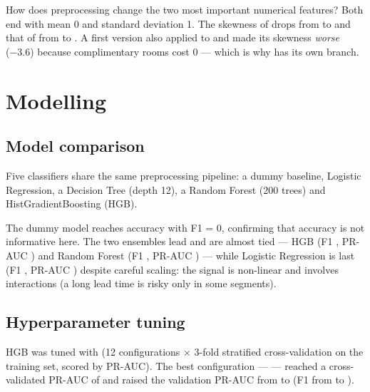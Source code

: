 \begin{finding}
\Q How does preprocessing change the two most important numerical features?
\F Both end with mean 0 and standard deviation 1. The skewness of  drops from \TBSkewLeadBefore{} to
\TBSkewLeadAfter{} and that of  from \TBSkewAdrBefore{} to \TBSkewAdrAfter. A first version also applied
 to  and made its skewness \emph{worse} (−3.6) because complimentary rooms cost 0 — which is why
 has its own branch.
\end{finding}

\section{Modelling}\label{tb:models}
\subsection{Model comparison}
Five classifiers share the same preprocessing pipeline: a dummy baseline, Logistic Regression, a Decision Tree (depth 12),
a Random Forest (200 trees) and HistGradientBoosting (HGB).

\begin{table}[H]\centering\small
\caption{Validation scores (threshold 0.5). The tuned model is described in Section~\ref{tb:tuning}.}\label{tb:tab-val}

\end{table}

The dummy model reaches \TBValDummyAcc{} accuracy with F1 = 0, confirming that accuracy is not informative here. The two
ensembles lead and are almost tied — HGB (F1 \TBValHgbF, PR-AUC \TBValHgbPR) and Random Forest (F1 \TBValRfF, PR-AUC
\TBValRfPR) — while Logistic Regression is last (F1 \TBValLrF, PR-AUC \TBValLrPR) despite careful scaling: the signal is
non-linear and involves interactions (a long lead time is risky only in some segments).

\subsection{Hyperparameter tuning}\label{tb:tuning}
HGB was tuned with  (12 configurations × 3-fold stratified cross-validation on the training set,
scored by PR-AUC). The best configuration — \TBTuneParams{} — reached a cross-validated PR-AUC of \TBTuneCV{} and raised the
validation PR-AUC from \TBValHgbPR{} to \TBValTunedPR{} (F1 from \TBValHgbF{} to \TBValTunedF).

